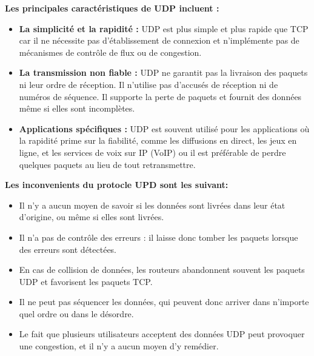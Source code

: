 \textbf{Les principales caractéristiques de UDP incluent :} 
\begin{itemize}
    \item \textbf{La simplicité et la rapidité :} UDP est plus simple et plus rapide que TCP car il ne nécessite pas d'établissement de connexion et n'implémente pas de mécanismes de contrôle de flux ou de congestion. 
    \item \textbf{La transmission non fiable :} UDP ne garantit pas la livraison des paquets ni leur ordre de réception. Il n'utilise pas d'accusés de réception ni de numéros de séquence. Il supporte la perte de paquets et fournit des données même si elles sont incomplètes. 
    \item \textbf{Applications spécifiques :} UDP est souvent utilisé pour les applications où la rapidité prime sur la fiabilité, comme les diffusions en direct, les jeux en ligne, et les services de voix sur IP (VoIP) ou il est préférable de perdre quelques paquets au lieu de tout retransmettre. 
\end{itemize}

\textbf{Les inconvenients du protocle UPD sont les suivant:}
\begin{itemize}
    \item Il n’y a aucun moyen de savoir si les données sont livrées dans leur état d’origine, ou même si elles sont livrées.
    \item Il n’a pas de contrôle des erreurs : il laisse donc tomber les paquets lorsque des erreurs sont détectées.
    \item En cas de collision de données, les routeurs abandonnent souvent les paquets UDP et favorisent les paquets TCP.
    \item Il ne peut pas séquencer les données, qui peuvent donc arriver dans n’importe quel ordre ou dans le désordre.
    \item Le fait que plusieurs utilisateurs acceptent des données UDP peut provoquer une congestion, et il n’y a aucun moyen d’y remédier.
\end{itemize}


